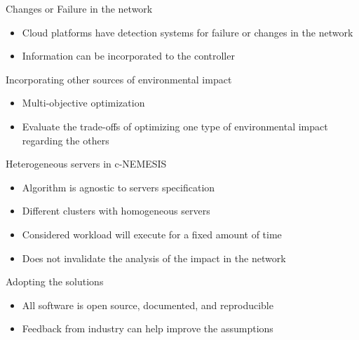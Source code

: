 \documentclass[Ligatures=TeX,table,svgnames,usetotalslideindicator,compress,10pt,aspectratio=169]{beamer}
\begin{document}
\begin{frame}{Changes or Failure in the network}
    \begin{itemize}
        \item Cloud platforms have detection systems for failure or changes in the network
        \item Information can be incorporated to the controller
    \end{itemize}
\end{frame}


\begin{frame}{Incorporating other sources of environmental impact}
    
    \begin{itemize}    
        
        \item Multi-objective optimization
        \item Evaluate the trade-offs of optimizing one type of environmental impact regarding the others        

    \end{itemize}            

\end{frame}


\begin{frame}{Heterogeneous servers in c-NEMESIS}

    \begin{itemize}    
    
        \item Algorithm is agnostic to servers specification
        \item Different clusters with homogeneous servers
        \item Considered workload will execute for a fixed amount of time
        \item Does not invalidate the analysis of the impact in the network

    \end{itemize}        

\end{frame}


\begin{frame}{Adopting the solutions}
    \begin{itemize}        
        \item All software is open source, documented, and reproducible
        \item Feedback from industry can help improve the assumptions
    \end{itemize}        
\end{frame}
\end{document}
